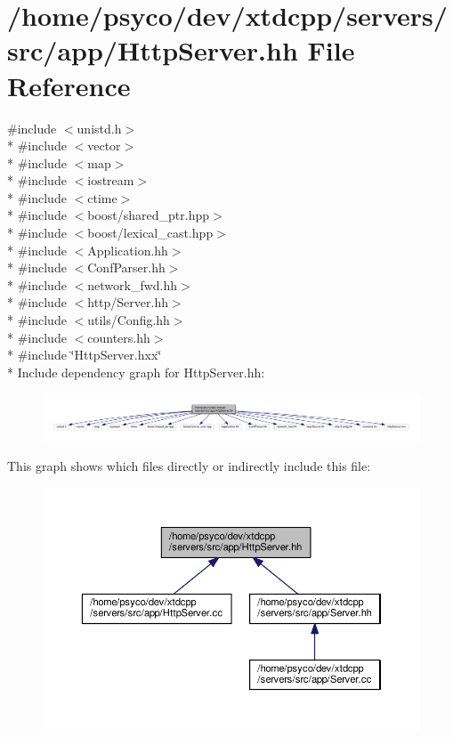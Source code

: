 \hypertarget{HttpServer_8hh}{}\section{/home/psyco/dev/xtdcpp/servers/src/app/\+Http\+Server.hh File Reference}
\label{HttpServer_8hh}
{\ttfamily \#include $<$unistd.\+h$>$}\\*
{\ttfamily \#include $<$vector$>$}\\*
{\ttfamily \#include $<$map$>$}\\*
{\ttfamily \#include $<$iostream$>$}\\*
{\ttfamily \#include $<$ctime$>$}\\*
{\ttfamily \#include $<$boost/shared\+\_\+ptr.\+hpp$>$}\\*
{\ttfamily \#include $<$boost/lexical\+\_\+cast.\+hpp$>$}\\*
{\ttfamily \#include $<$Application.\+hh$>$}\\*
{\ttfamily \#include $<$Conf\+Parser.\+hh$>$}\\*
{\ttfamily \#include $<$network\+\_\+fwd.\+hh$>$}\\*
{\ttfamily \#include $<$http/\+Server.\+hh$>$}\\*
{\ttfamily \#include $<$utils/\+Config.\+hh$>$}\\*
{\ttfamily \#include $<$counters.\+hh$>$}\\*
{\ttfamily \#include \char`\"{}Http\+Server.\+hxx\char`\"{}}\\*
Include dependency graph for Http\+Server.\+hh\+:
\nopagebreak
\begin{figure}[H]
\begin{center}
\leavevmode
\includegraphics[width=350pt]{HttpServer_8hh__incl}
\end{center}
\end{figure}
This graph shows which files directly or indirectly include this file\+:
\nopagebreak
\begin{figure}[H]
\begin{center}
\leavevmode
\includegraphics[width=350pt]{HttpServer_8hh__dep__incl}
\end{center}
\end{figure}
